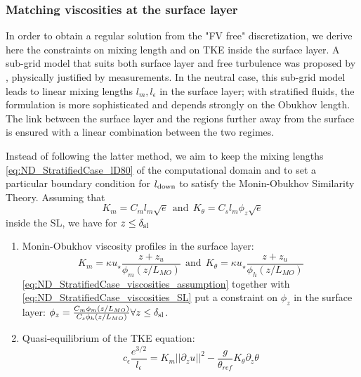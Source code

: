 \subsubsection{Matching viscosities at the surface layer}
\label{sec:ND_StratifiedCase_mixing_lengths_match}
In order to obtain a regular solution from the "FV free"
discretization, we derive here the constraints on mixing length
and on TKE inside the surface layer.
A sub-grid model that suits both
surface layer and free turbulence was proposed by
\citep{redelsperger_simple_2001}, physically
justified by measurements.
In the neutral case, this sub-grid model leads to linear
mixing lengths $l_m, l_{\epsilon}$ in the surface layer;
with stratified fluids, the formulation is more sophisticated
and depends strongly on the Obukhov length.
The link between the surface layer and the regions
further away from the surface is ensured with a linear combination
between the two regimes.
%
\par
Instead of following the latter method,
we aim to keep the mixing lengths \eqref{eq:ND_StratifiedCase_lD80}
of the computational domain and
to set a particular boundary condition for $l_{\rm down}$
to satisfy the Monin-Obukhov Similarity Theory.
Assuming that 
\begin{equation}
	\label{eq:ND_StratifiedCase_viscosities_assumption}
K_m = C_m l_m \sqrt{e} ~~\text{and}~~
K_\theta = C_s l_m \phi_z \sqrt{e}
\end{equation}
 inside the SL, we have
for $z\leq \delta_{\rm sl}$
\begin{enumerate}
\item
Monin-Obukhov viscosity profiles in the surface layer:
\begin{equation}
	\label{eq:ND_StratifiedCase_viscosities_SL}
	K_m = \kappa u_\star\frac{z+ z_{u}}{\phi_m(z/L_{MO})} ~~\text{and}~~
K_\theta = \kappa u_\star\frac{z+ z_{u}}{\phi_h(z/L_{MO})}
\end{equation}
\eqref{eq:ND_StratifiedCase_viscosities_assumption}
together with \eqref{eq:ND_StratifiedCase_viscosities_SL} put
a constraint on $\phi_z$ in the surface layer:
$\phi_z = \frac{C_m\phi_m(z/L_{MO})}{C_s\phi_h(z/L_{MO})}
		\forall z\leq \delta_{\rm sl}$.
\item Quasi-equilibrium of the TKE equation:
\begin{equation}
	\label{eq:ND_StratifiedCase_TKE_quasi_equilibrium}
	c_\epsilon \frac{e^{3/2}}{l_\epsilon}=K_m ||\partial_z u||^2 - \frac{g}{\theta_{ref}} K_\theta \partial_z \theta
\end{equation}
\end{enumerate}
